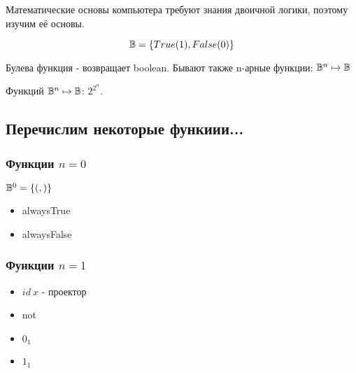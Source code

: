 \documentclass[a4paper, 12pt]{article}
\begin{document}
    Математические основы компьютера требуют знания двоичной логики, 
    поэтому изучим её основы.

    \begin{equation}
        {\mathbb{B}} = \{ True (1), False(0) \}
    \end{equation}
    
    Булева функция - возвращает boolean.
    Бывают также n-арные функции: ${\mathbb{B}}^n \mapsto {\mathbb{B}}$

    
    Функций ${\mathbb{B}}^n \mapsto {\mathbb{B}}$: $2^{2^n}$.

    \subsection{Перечислим некоторые функиии...}

    \subsubsection{Функции $n = 0$}

    ${\mathbb{B}}^0 = \{ (,) \}$
    
    \begin{itemize}
        \item alwaysTrue
        \item alwaysFalse
    \end{itemize}

    \subsubsection{Функции $n = 1$}
    \begin{itemize}
        \item $id ~ x$ - проектор
        \item not
        \item $0_1$
        \item $1_1$
    \end{itemize}
\end{document}
